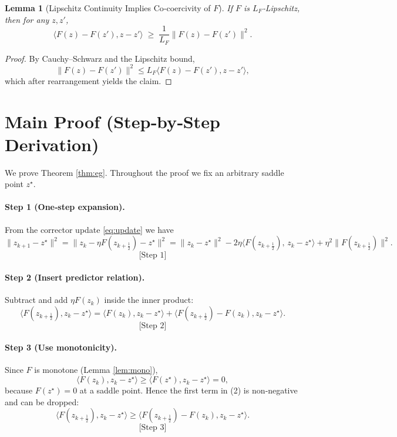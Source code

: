 \documentclass{article}
\newtheorem{lemma}{Lemma}
\begin{document}
\begin{lemma}[Lipschitz Continuity Implies Co‑coercivity of $F$]\label{lem:coercive}
If $F$ is $L_{F}$‑Lipschitz, then for any $z,z'$,
\[
\langle F(z)-F(z'),z-z'\rangle\;\ge\;\frac{1}{L_{F}}\|F(z)-F(z')\|^{2}.
\]
\end{lemma}
\begin{proof}
By Cauchy–Schwarz and the Lipschitz bound,
\[
\|F(z)-F(z')\|^{2}\le L_{F}\langle F(z)-F(z'),z-z'\rangle,
\]
which after rearrangement yields the claim. \qedhere
\end{proof}

\section*{Main Proof (Step‑by‑Step Derivation)}
We prove Theorem \ref{thm:eg}. Throughout the proof we fix an arbitrary saddle point $z^{\star}$.

\paragraph{Step 1 (One‑step expansion).}
From the corrector update \eqref{eq:update} we have
\[
\|z_{k+1}-z^{\star}\|^{2}
= \|z_{k}-\eta F(z_{k+\frac12})-z^{\star}\|^{2}
= \|z_{k}-z^{\star}\|^{2}
-2\eta\langle F(z_{k+\frac12}),\,z_{k}-z^{\star}\rangle
+\eta^{2}\|F(z_{k+\frac12})\|^{2}. \tag{1}
\]
\[
\text{[Step 1]}
\]

\paragraph{Step 2 (Insert predictor relation).}
Subtract and add $\eta F(z_{k})$ inside the inner product:
\[
\langle F(z_{k+\frac12}),z_{k}-z^{\star}\rangle
= \langle F(z_{k}),z_{k}-z^{\star}\rangle
+ \langle F(z_{k+\frac12})-F(z_{k}),z_{k}-z^{\star}\rangle .
\tag{2}
\]
\[
\text{[Step 2]}
\]

\paragraph{Step 3 (Use monotonicity).}
Since $F$ is monotone (Lemma \ref{lem:mono}),
\[
\langle F(z_{k}),z_{k}-z^{\star}\rangle\ge
\langle F(z^{\star}),z_{k}-z^{\star}\rangle=0,
\]
because $F(z^{\star})=0$ at a saddle point. Hence the first term in (2) is non‑negative and can be dropped:
\[
\langle F(z_{k+\frac12}),z_{k}-z^{\star}\rangle
\ge \langle F(z_{k+\frac12})-F(z_{k}),z_{k}-z^{\star}\rangle .
\tag{3}
\]
\[
\text{[Step 3]}
\]
\end{document}
